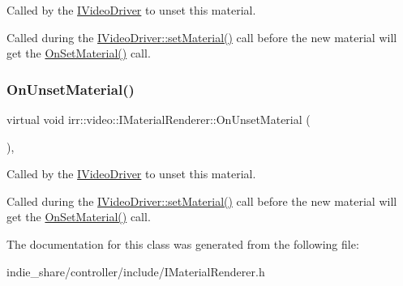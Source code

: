 Called by the \hyperlink{classirr_1_1video_1_1IVideoDriver}{I\+Video\+Driver} to unset this material. 

Called during the \hyperlink{classirr_1_1video_1_1IVideoDriver_a8c9e31b41b7e6fd26cf65ce538ebab05}{I\+Video\+Driver\+::set\+Material()} call before the new material will get the \hyperlink{classirr_1_1video_1_1IMaterialRenderer_aeaffc03c1b9feb40cd01469726b287e3}{On\+Set\+Material()} call. \mbox{\label{classirr_1_1video_1_1IMaterialRenderer_a694b1285671853cb151c03100fd01c73}} 
\subsubsection{\texorpdfstring{On\+Unset\+Material()}{OnUnsetMaterial()}\hspace{0.1cm}{\footnotesize\ttfamily [2/2]}}
{\footnotesize\ttfamily virtual void irr\+::video\+::\+I\+Material\+Renderer\+::\+On\+Unset\+Material (\begin{DoxyParamCaption}{ }\end{DoxyParamCaption})\hspace{0.3cm}{\ttfamily [inline]}, {\ttfamily [virtual]}}



Called by the \hyperlink{classirr_1_1video_1_1IVideoDriver}{I\+Video\+Driver} to unset this material. 

Called during the \hyperlink{classirr_1_1video_1_1IVideoDriver_a8c9e31b41b7e6fd26cf65ce538ebab05}{I\+Video\+Driver\+::set\+Material()} call before the new material will get the \hyperlink{classirr_1_1video_1_1IMaterialRenderer_aeaffc03c1b9feb40cd01469726b287e3}{On\+Set\+Material()} call. 

The documentation for this class was generated from the following file\+:\begin{DoxyCompactItemize}
\item 
indie\+\_\+share/controller/include/I\+Material\+Renderer.\+h\end{DoxyCompactItemize}
